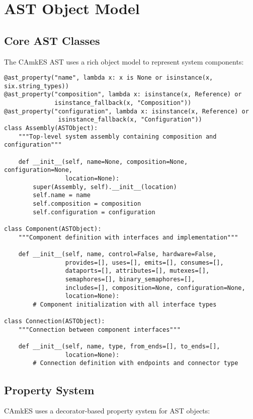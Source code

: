 \documentclass[12pt,a4paper]{article}
\begin{document}
\section{AST Object Model}

\subsection{Core AST Classes}

The CAmkES AST uses a rich object model to represent system components:


\begin{lstlisting}[style=python]
@ast_property("name", lambda x: x is None or isinstance(x, six.string_types))
@ast_property("composition", lambda x: isinstance(x, Reference) or 
              isinstance_fallback(x, "Composition"))
@ast_property("configuration", lambda x: isinstance(x, Reference) or 
               isinstance_fallback(x, "Configuration"))
class Assembly(ASTObject):
    """Top-level system assembly containing composition and configuration"""
    
    def __init__(self, name=None, composition=None, configuration=None, 
                 location=None):
        super(Assembly, self).__init__(location)
        self.name = name
        self.composition = composition
        self.configuration = configuration

class Component(ASTObject):
    """Component definition with interfaces and implementation"""
    
    def __init__(self, name, control=False, hardware=False,
                 provides=[], uses=[], emits=[], consumes=[],
                 dataports=[], attributes=[], mutexes=[],
                 semaphores=[], binary_semaphores=[], 
                 includes=[], composition=None, configuration=None,
                 location=None):
        # Component initialization with all interface types
        
class Connection(ASTObject):
    """Connection between component interfaces"""
    
    def __init__(self, name, type, from_ends=[], to_ends=[], 
                 location=None):
        # Connection definition with endpoints and connector type
\end{lstlisting}

\subsection{Property System}
CAmkES uses a decorator-based property system for AST objects:
\end{document}
